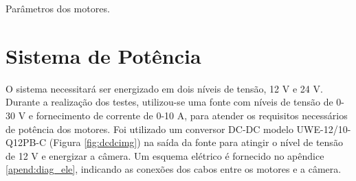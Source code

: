 \begin{table}[H]
    \centering
    \caption{Parâmetros dos motores.}

    \label{tab:specs}
    \caption*{Fonte: \cite{dynamixel}}
\end{table}

\section{Sistema de Potência}
O sistema necessitará ser energizado em dois níveis de tensão, 12 V e 24 V. Durante a realização dos testes, utilizou-se uma fonte com níveis de tensão de 0-30 V e fornecimento de corrente de 0-10 A, para atender os requisitos necessários de potência dos motores. Foi utilizado um conversor DC-DC modelo UWE-12/10-Q12PB-C (Figura \ref{fig:dcdcimg}) na saída da fonte para atingir o nível de tensão de 12 V e energizar a câmera. Um esquema elétrico é fornecido no apêndice \ref{apend:diag_ele}, indicando as conexões dos cabos entre os motores e a câmera.

